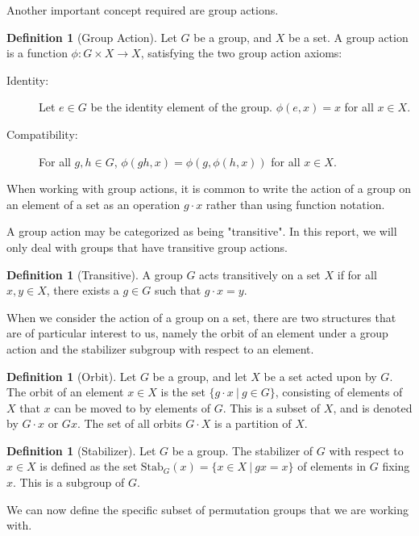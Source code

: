 \documentclass[11pt]{article} %
\theoremstyle{definition}
\newtheorem{definition}[theorem]{Definition}
\theoremstyle{remark}
\newcommand{\stab}[2]{\textrm{Stab}_{#1}({#2})}
\begin{document}
Another important concept required are group actions.

\begin{definition}[Group Action]
Let $G$ be a group, and $X$ be a set. A group action is a function $\phi : G \times X \to X$, satisfying the two group action axioms:
\begin{description}
\item[Identity:] Let $e \in G$ be the identity element of the group. $\phi(e,x) = x$ for all $x \in X$.
\item[Compatibility:] For all $g, h \in G$, $\phi(gh, x) = \phi(g, \phi(h, x))$ for all $x \in X$.
\end{description}
When working with group actions, it is common to write the action of a group on an element of a set as an operation $g \cdot x$ rather than using function notation.
\end{definition}

A group action may be categorized as being "transitive". In this report, we will only deal with groups that have transitive group actions.

\begin{definition}[Transitive]
A group $G$ acts transitively on a set $X$ if for all $x,y \in X$, there exists a $g \in G$ such that $g \cdot x = y$.
\end{definition}

When we consider the action of a group on a set, there are two structures that are of particular interest to us, namely the orbit of an element under a group action and the stabilizer subgroup with respect to an element.

\begin{definition}[Orbit]
Let $G$ be a group, and let $X$ be a set acted upon by $G$. The orbit of an element $x \in X$ is the set $\lbrace g \cdot x \ | \ g \in G \rbrace$, consisting of elements of $X$ that $x$ can be moved to by elements of $G$. This is a subset of $X$, and is denoted by $G \cdot x$ or $Gx$. The set of all orbits $G \cdot X$ is a partition of $X$.
\end{definition}

\begin{definition}[Stabilizer]
Let $G$ be a group. The stabilizer of $G$ with respect to $x \in X$ is defined as the set $\stab{G}{x} = \lbrace x \in X \ | \ gx = x\rbrace$ of elements in $G$ fixing $x$. This is a subgroup of $G$.
\end{definition}

We can now define the specific subset of permutation groups that we are working with.
\end{document}
